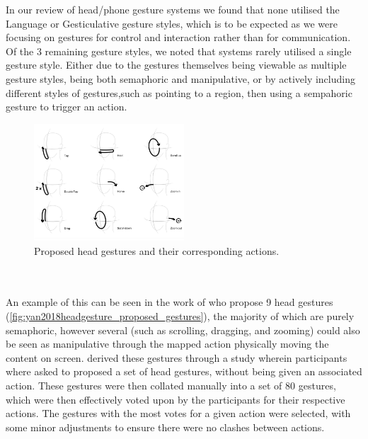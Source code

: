 In our review of head/phone gesture systems we found that none utilised the Language or Gesticulative gesture styles, which is to be expected as we were focusing on gestures for control and interaction rather than for communication.
Of the 3 remaining gesture styles, we noted that systems rarely utilised a single gesture style. Either due to the gestures themselves being viewable as multiple gesture styles, being both semaphoric and manipulative, or by actively including different styles of gestures,such as pointing to a region, then using a sempahoric gesture to trigger an action.
\begin{figure}
    \centering
    \includegraphics[width=0.5\textwidth]{figures/yan2018headgesture_fig2_proposed_gestures.png}
    \caption{\label{fig:yan2018headgesture_proposed_gestures} Proposed head gestures and their corresponding actions\cite{yan2018headgesture}.}
\end{figure}
\\\\
An example of this can be seen in the work of \citeauthor{yan2018headgesture}\cite{yan2018headgesture} who propose 9 head gestures (\autoref{fig:yan2018headgesture_proposed_gestures}), the majority of which are purely semaphoric, however several (such as scrolling, dragging, and zooming) could also be seen as manipulative through the mapped action physically moving the content on screen.
\citeauthor{yan2018headgesture} derived these gestures through a study wherein participants where asked to proposed a set of head gestures, without being given an associated action. These gestures were then collated manually into a set of 80 gestures, which were then effectively voted upon by the participants for their respective actions.
The gestures with the most votes for a given action were selected, with some minor adjustments to ensure there were no clashes between actions.

